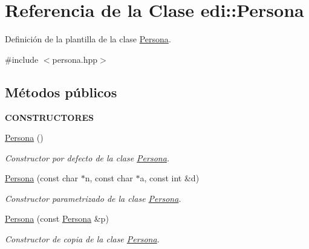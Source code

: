 \hypertarget{classedi_1_1Persona}{\section{Referencia de la Clase edi\+:\+:Persona}
\label{classedi_1_1Persona}
}


Definición de la plantilla de la clase \hyperlink{classedi_1_1Persona}{Persona}.  




{\ttfamily \#include $<$persona.\+hpp$>$}

\subsection*{Métodos públicos}
\begin{Indent}{\bf C\+O\+N\+S\+T\+R\+U\+C\+T\+O\+R\+E\+S}\par
\begin{DoxyCompactItemize}
\item 
\hyperlink{classedi_1_1Persona_adf50e6e02e0d82db7037f74a6cbd7650}{Persona} ()
\begin{DoxyCompactList}\small\item\em Constructor por defecto de la clase \hyperlink{classedi_1_1Persona}{Persona}. \end{DoxyCompactList}\item 
\hyperlink{classedi_1_1Persona_ac9b88a733b460d61ad145e9c38576eef}{Persona} (const char $\ast$n, const char $\ast$a, const int \&d)
\begin{DoxyCompactList}\small\item\em Constructor parametrizado de la clase \hyperlink{classedi_1_1Persona}{Persona}. \end{DoxyCompactList}\item 
\hyperlink{classedi_1_1Persona_aa73785a179a7230fba804826bff5ab62}{Persona} (const \hyperlink{classedi_1_1Persona}{Persona} \&p)
\begin{DoxyCompactList}\small\item\em Constructor de copia de la clase \hyperlink{classedi_1_1Persona}{Persona}. \end{DoxyCompactList}\end{DoxyCompactItemize}
\end{Indent}
